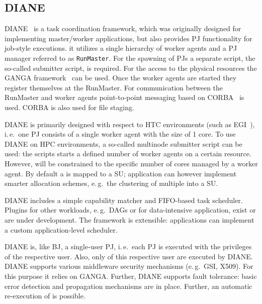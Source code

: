 \documentclass{sig-alternate}
\begin{document}
\subsection{DIANE}


DIANE~\cite{Moscicki:908910} is a task coordination framework, which
was originally designed for implementing master/worker applications,
but also provides PJ functionality for job-style executions. it
utilizes a single hierarchy of worker agents and a PJ manager
referred to as \texttt{RunMaster}.
For the spawning of PJs a separate script, the so-called submitter script, is
required. For the access to the physical resources the GANGA
framework~\cite{Moscicki20092303} can be used.
Once the worker agents are started they register themselves at the RunMaster.
For communication between the RunMaster and worker agents point-to-point
messaging based on CORBA~\cite{OMG-CORBA303:2004} is used. CORBA is also used
for file staging.

DIANE is primarily designed with respect to HTC environments (such as
EGI~\cite{egi}), i.\,e.\ one PJ consists of a single worker agent with the
size of 1 core.
To use DIANE on HPC environments, a so-called multinode submitter script can be
used: the scripts starts a defined number of worker agents on a certain
resource.
However, \cus will be constrained to the specific number of cores
managed by a worker agent.
By default a \cu  is mapped to a SU; application can however implement smarter
allocation schemes, e.\,g.\ the clustering of multiple \cus into a SU.

DIANE includes a simple capability matcher and FIFO-based task scheduler.
Plugins for other workloads, e.\,g.\ DAGs or for data-intensive
application, exist or are under development. The framework is extensible:
applications can implement a custom application-level scheduler.


DIANE is, like BJ, a single-user PJ, i.\,e.\ each PJ is executed with the privileges
of the respective user. Also, only \cus of this respective user are executed
by DIANE. DIANE supports various middleware security mechanisms (e.\,g.\ GSI,
X509). For this purpose it relies on GANGA.
Further, DIANE supports fault tolerance: basic error detection and propagation
mechanisms are in place. Further, an automatic re-execution of \cus is
possible.
\end{document}
